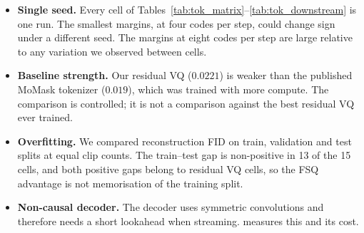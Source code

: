 \begin{itemize}
\item \textbf{Single seed.} Every cell of Tables~\ref{tab:tok_matrix}--\ref{tab:tok_downstream} is one run. The smallest margins, at four codes per step, could change sign under a different seed. The margins at eight codes per step are large relative to any variation we observed between cells.
\item \textbf{Baseline strength.} Our residual VQ ($0.0221$) is weaker than the published MoMask tokenizer ($0.019$), which was trained with more compute. The comparison is controlled; it is not a comparison against the best residual VQ ever trained.
\item \textbf{Overfitting.} We compared reconstruction FID on train, validation and test splits at equal clip counts. The train--test gap is non-positive in 13 of the 15 cells, and both positive gaps belong to residual VQ cells, so the FSQ advantage is not memorisation of the training split.
\item \textbf{Non-causal decoder.} The decoder uses symmetric convolutions and therefore needs a short lookahead when streaming.  measures this and its cost.
\end{itemize}
